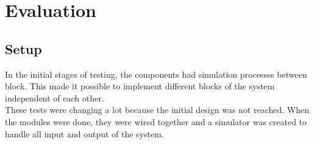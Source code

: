 \chapter{Evaluation}
\label{chap:evaluation}
\section{Setup}
In the initial stages of testing, the components had simulation processes between
block. This made it possible to implement different blocks of the system
independent of each other.\\
These tests were changing a lot because the initial design was not
reached.
When the modules were done, they were wired together and a simulator
was created to handle all input and output of the system.

